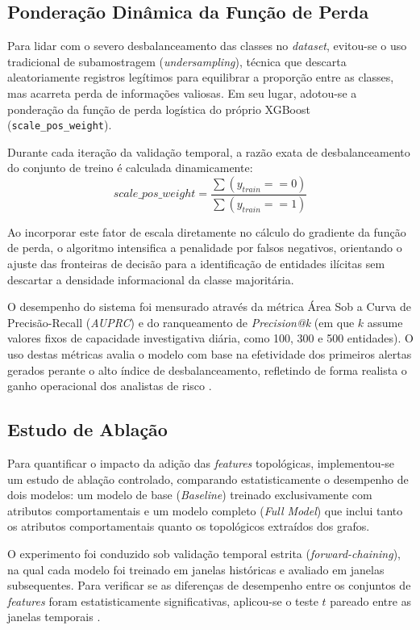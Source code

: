 \documentclass[a4paper,12pt,oneside,onecolumn,final,fleqn]{repUERJ}
\begin{document}
\subsection{Ponderação Dinâmica da Função de Perda}
Para lidar com o severo desbalanceamento das classes no \textit{dataset}, evitou-se o uso tradicional de subamostragem (\textit{undersampling}), técnica que descarta aleatoriamente registros legítimos para equilibrar a proporção entre as classes, mas acarreta perda de informações valiosas. Em seu lugar, adotou-se a ponderação da função de perda logística do próprio XGBoost (\texttt{scale\_pos\_weight}). 

Durante cada iteração da validação temporal, a razão exata de desbalanceamento do conjunto de treino é calculada dinamicamente:
\begin{equation}
    scale\_pos\_weight = \frac{\sum (y_{train} == 0)}{\sum (y_{train} == 1)}
\end{equation}

Ao incorporar este fator de escala diretamente no cálculo do gradiente da função de perda, o algoritmo intensifica a penalidade por falsos negativos, orientando o ajuste das fronteiras de decisão para a identificação de entidades ilícitas sem descartar a densidade informacional da classe majoritária.

O desempenho do sistema foi mensurado através da métrica Área Sob a Curva de Precisão-Recall (\textit{AUPRC}) e do ranqueamento de \textit{Precision@k} (em que $k$ assume valores fixos de capacidade investigativa diária, como 100, 300 e 500 entidades). O uso destas métricas avalia o modelo com base na efetividade dos primeiros alertas gerados perante o alto índice de desbalanceamento, refletindo de forma realista o ganho operacional dos analistas de risco \cite{karim2024scalable}.

\subsection{Estudo de Ablação}

Para quantificar o impacto da adição das \textit{features} topológicas, implementou-se um estudo de ablação controlado, comparando estatisticamente o desempenho de dois modelos: um modelo de base (\textit{Baseline}) treinado exclusivamente com atributos comportamentais e um modelo completo (\textit{Full Model}) que inclui tanto os atributos comportamentais quanto os topológicos extraídos dos grafos.

O experimento foi conduzido sob validação temporal estrita (\textit{forward-chaining}), na qual cada modelo foi treinado em janelas históricas e avaliado em janelas subsequentes. Para verificar se as diferenças de desempenho entre os conjuntos de \textit{features} foram estatisticamente significativas, aplicou-se o teste $t$ pareado entre as janelas temporais \cite{dietterich1998approximate, japkowicz2011evaluating}.
\end{document}

